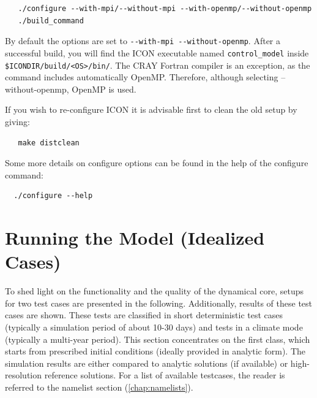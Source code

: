 \begin{small}
  \begin{verbatim}
   ./configure --with-mpi/--without-mpi --with-openmp/--without-openmp
   ./build_command
  \end{verbatim}
\end{small}

By default the options are set to \verb+--with-mpi --without-openmp+. After a successful build, you will find the ICON executable named \verb+control_model+ inside \verb+$ICONDIR/build/<OS>/bin/+. The CRAY Fortran compiler is an exception, as the command includes automatically OpenMP. Therefore, although selecting --without-openmp, OpenMP is used.

If you wish to re-configure ICON it is advisable first to clean the old setup by giving:

\begin{small}
  \begin{verbatim}
   make distclean  
  \end{verbatim}
\end{small}

Some more details on configure options can be found in the help of the configure command:

\begin{small}
 \begin{verbatim}
  ./configure --help
 \end{verbatim}
\end{small}

\section{Running the Model (Idealized Cases)}
\label{chap:UG_running_model_idealized}

To shed light on the functionality and the quality of the dynamical core, setups for two test cases are presented in the following. Additionally, results of these test cases are shown. These tests are classified in short deterministic test cases (typically a simulation period of about 10-30 days) and tests in a climate mode (typically a multi-year period). This section concentrates on the first class, which starts from prescribed initial conditions (ideally provided in analytic form). The simulation results are either compared to analytic solutions (if available) or high-resolution reference solutions. For a list of available testcases, the reader is referred to the namelist section (\ref{chap:namelists}).

